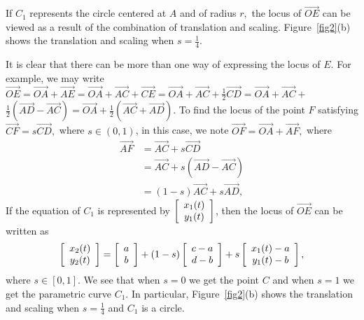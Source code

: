 \documentclass[12pt,a4paper]{article}%
\begin{document}
If $C_{1}$ represents the circle centered at $A$ and of radius $r,$ the locus
of $\overrightarrow{OE}$ can be viewed as a result of the combination of
translation and scaling. Figure~\ref{fig2}(b) shows the translation and scaling
when $s=\frac{1}{4}$.

It is clear that there can be more than one way of expressing the locus of $E$.
For example, we may write $\overrightarrow{OE}=\overrightarrow{OA}%
+\overrightarrow{AE}=\overrightarrow{OA}+\overrightarrow{AC}+\overrightarrow
{CE}=\overrightarrow{OA}+\overrightarrow{AC}+\frac{1}{2}\overrightarrow
{CD}=\overrightarrow{OA}+\overrightarrow{AC}+$ $\frac{1}{2}\left(
\overrightarrow{AD}-\overrightarrow{AC}\right)  =\overrightarrow{OA}+\frac
{1}{2}\left(  \overrightarrow{AC}+\overrightarrow{AD}\right)  $. To find the
locus of the point $F$ satisfying $\overrightarrow{CF}=s\overrightarrow{CD},$
where $s\in(0,1)$, in this case, we note $\overrightarrow{OF}=\overrightarrow
{OA}+\overrightarrow{AF},$ where
\begin{align}
\overrightarrow{AF}  & =\overrightarrow{AC}+s\overrightarrow{CD}\label{eq9b}\\
& =\overrightarrow{AC}+s\left(  \overrightarrow{AD}-\overrightarrow{AC}\right)
\nonumber\\
& = \left(  1-s\right) \overrightarrow{AC}  + s \overrightarrow{AD},
\end{align}
If the equation of $C_{1}$ is represented by $\left[
\begin{array}
[c]{c}%
x_{1}(t)\\
y_{1}(t)
\end{array}
\right]$, then the locus of $\overrightarrow{OE}$ can be written as
\[
\left[
\begin{array}
[c]{c}%
x_{2}(t)\\
y_{2}(t)
\end{array}
\right]  =\left[
\begin{array}
[c]{c}%
a\\
b
\end{array}
\right]  +(1-s)\left[
\begin{array}
[c]{c}%
c-a\\
d-b
\end{array}
\right]  +s\left[
\begin{array}
[c]{c}%
x_{1}(t)-a\\
y_{1}(t)-b
\end{array}
\right],
\]
where $s\in[0,1]$. We see that when $s=0$ we get the point $C$ and
when $s=1$ we get the parametric curve $C_{1}$. In particular,
Figure~\ref{fig2}(b) shows the translation and scaling when $s=\frac{1}{4}$ and $C_{1}$ is a
circle.
\end{document}
